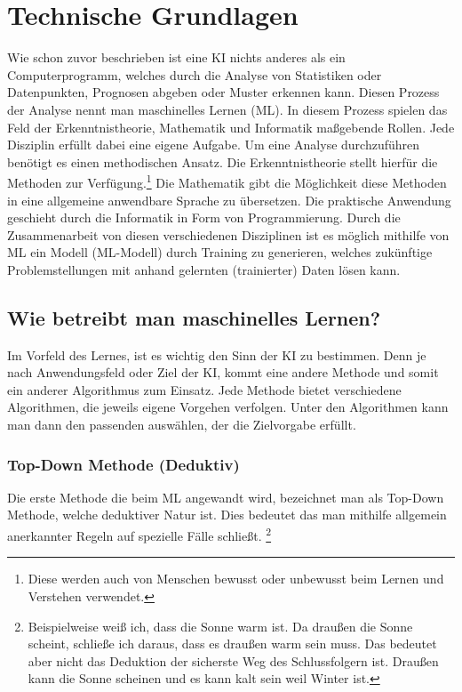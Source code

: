 \documentclass[12pt,german,ngerman]{report}
\begin{document}
\chapter{Technische Grundlagen}
     Wie schon zuvor beschrieben ist eine KI nichts anderes als ein Computerprogramm,
     welches durch die Analyse von Statistiken oder Datenpunkten, Prognosen abgeben oder Muster erkennen kann.
     Diesen Prozess der Analyse nennt man maschinelles Lernen (ML).
     In diesem Prozess spielen das Feld der Erkenntnistheorie, Mathematik und Informatik 
     maßgebende Rollen. Jede Disziplin erfüllt dabei eine eigene Aufgabe.
     Um eine Analyse durchzuführen benötigt es einen methodischen Ansatz.
     Die Erkenntnistheorie stellt hierfür die Methoden zur Verfügung.\footnote{Diese werden auch von 
     Menschen bewusst oder unbewusst beim Lernen und Verstehen verwendet.}
     Die Mathematik gibt die Möglichkeit diese Methoden in eine allgemeine anwendbare Sprache zu übersetzen.
     Die praktische Anwendung geschieht durch die Informatik in Form von Programmierung.
     Durch die Zusammenarbeit von diesen verschiedenen Disziplinen ist es
     möglich mithilfe von ML ein Modell (ML-Modell) durch Training zu generieren,
     welches zukünftige Problemstellungen mit anhand gelernten (trainierter) Daten lösen kann.
        
    \section{Wie betreibt man maschinelles Lernen?}
        Im Vorfeld des Lernes, ist es wichtig den Sinn der KI zu bestimmen.
        Denn je nach Anwendungsfeld oder Ziel der KI, kommt eine andere Methode und somit
        ein anderer Algorithmus zum Einsatz. Jede Methode bietet verschiedene Algorithmen,
        die jeweils eigene Vorgehen verfolgen. Unter den Algorithmen kann man
        dann den passenden auswählen, der die Zielvorgabe erfüllt.

    \newpage    

    \subsection{Top-Down Methode (Deduktiv)}
        Die erste Methode die beim ML angewandt wird, bezeichnet man als Top-Down Methode,
        welche deduktiver Natur ist. Dies bedeutet das man mithilfe  allgemein anerkannter Regeln
        auf spezielle Fälle schließt.\cite{dundi2021unileipzig} 
        \footnote{Beispielweise weiß ich, dass die Sonne warm ist. Da draußen die Sonne scheint, schließe ich daraus,
        dass es draußen warm sein muss. Das bedeutet aber nicht das Deduktion der sicherste Weg des 
        Schlussfolgern ist. Draußen kann die Sonne scheinen und es kann kalt sein weil Winter ist.}\\
\end{document}
